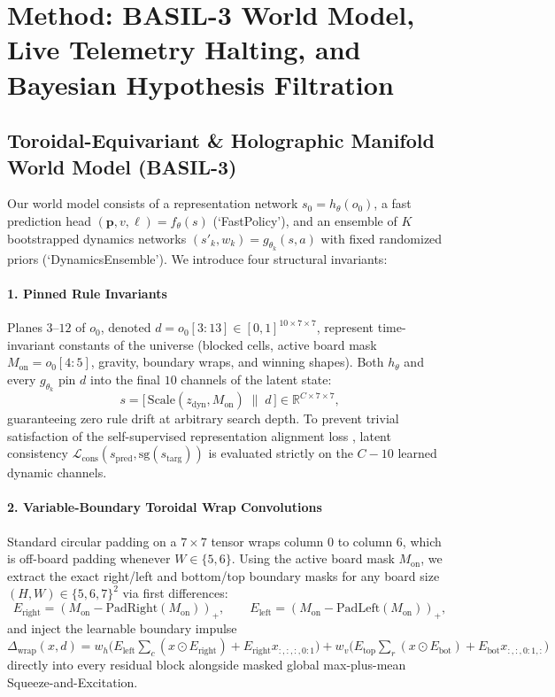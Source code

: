 \documentclass[preprint,3p,times]{elsarticle}
\begin{document}
\section{Method: BASIL-3 World Model, Live Telemetry Halting, and Bayesian Hypothesis Filtration}

\subsection{Toroidal-Equivariant \& Holographic Manifold World Model (BASIL-3)}
\label{sec:citadel}
Our world model consists of a representation network $s_0 = h_\theta(o_0)$, a fast prediction head $(\mathbf{p}, v, \boldsymbol{\ell}) = f_\theta(s)$ (`FastPolicy'), and an ensemble of $K$ bootstrapped dynamics networks $(s'_{k}, w_k) = g_{\theta_k}(s, a)$ with fixed randomized priors \citep{osband2018randomized} (`DynamicsEnsemble'). We introduce four structural invariants:

\paragraph{1. Pinned Rule Invariants}
Planes $3$--$12$ of $o_0$, denoted $d = o_0[3{:}13] \in [0, 1]^{10 \times 7 \times 7}$, represent time-invariant constants of the universe (blocked cells, active board mask $M_{\text{on}} = o_0[4{:}5]$, gravity, boundary wraps, and winning shapes). Both $h_\theta$ and every $g_{\theta_k}$ pin $d$ into the final $10$ channels of the latent state:
\begin{equation}
    s = \big[\,\mathrm{Scale}(z_{\text{dyn}}, M_{\text{on}}) \;\|\; d\,\big] \in \mathbb{R}^{C \times 7 \times 7},
\end{equation}
guaranteeing zero rule drift at arbitrary search depth. To prevent trivial satisfaction of the self-supervised representation alignment loss \citep{ye2021mastering}, latent consistency $\mathcal{L}_{\text{cons}}(s_{\text{pred}}, \mathrm{sg}(s_{\text{targ}}))$ is evaluated strictly on the $C - 10$ learned dynamic channels.

\paragraph{2. Variable-Boundary Toroidal Wrap Convolutions}
Standard circular padding on a $7 \times 7$ tensor wraps column $0$ to column $6$, which is off-board padding whenever $W \in \{5, 6\}$. Using the active board mask $M_{\text{on}}$, we extract the exact right/left and bottom/top boundary masks for any board size $(H, W) \in \{5, 6, 7\}^2$ via first differences:
\begin{equation}
    E_{\text{right}} = (M_{\text{on}} - \mathrm{PadRight}(M_{\text{on}}))_+, \qquad
    E_{\text{left}} = (M_{\text{on}} - \mathrm{PadLeft}(M_{\text{on}}))_+,
\end{equation}
and inject the learnable boundary impulse $\Delta_{\text{wrap}}(x, d) = w_h\big(E_{\text{left}}\sum_c (x \odot E_{\text{right}}) + E_{\text{right}} x_{:,:,:,0:1}\big) + w_v\big(E_{\text{top}}\sum_r (x \odot E_{\text{bot}}) + E_{\text{bot}} x_{:,:,0:1,:}\big)$ directly into every residual block alongside masked global max-plus-mean Squeeze-and-Excitation.
\end{document}
